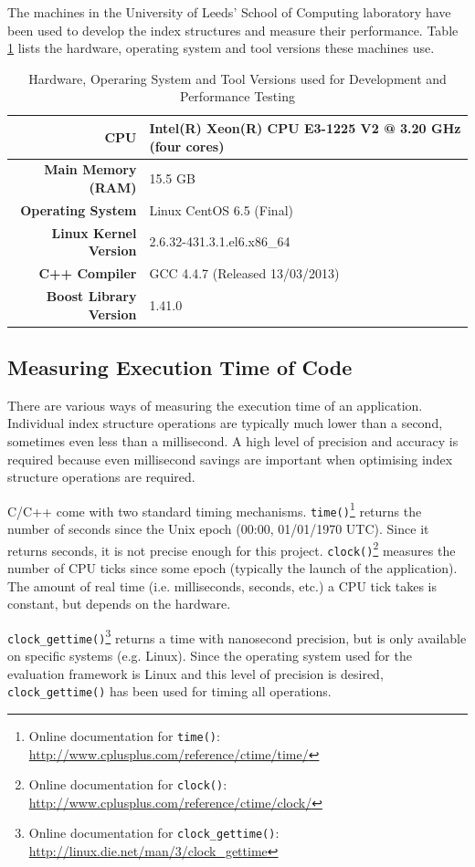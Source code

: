 The machines in the University of Leeds' School of Computing laboratory have been used to develop the index structures and measure their performance. Table \ref{tab:system-specifications} lists the hardware, operating system and tool versions these machines use.

\begin{table}
	\centering
	\begin{tabular}{|r|l|}
		\hline
		\textbf{CPU} & Intel(R) Xeon(R) CPU E3-1225 V2 @ 3.20 GHz (four cores) \\
		\hline
		\textbf{Main Memory (RAM)} & 15.5 GB \\
		\hline
		\textbf{Operating System} & Linux CentOS 6.5 (Final) \\
		\hline
		\textbf{Linux Kernel Version} & 2.6.32-431.3.1.el6.x86\_64 \\
		\hline
		\textbf{C++ Compiler} & GCC 4.4.7 (Released 13/03/2013) \\
		\hline
		\textbf{Boost Library Version} & 1.41.0 \\
		\hline
	\end{tabular}
	\caption{Hardware, Operaring System and Tool Versions used for Development and Performance Testing}
	\label{tab:system-specifications}
\end{table}

\subsection{Measuring Execution Time of Code}

There are various ways of measuring the execution time of an application. Individual index structure operations are typically much lower than a second, sometimes even less than a millisecond. A high level of precision and accuracy is required because even millisecond savings are important when optimising index structure operations are required.

C/C++ come with two standard timing mechanisms. \texttt{time()}\footnote{Online documentation for \texttt{time()}: \url{http://www.cplusplus.com/reference/ctime/time/}} returns the number of seconds since the Unix epoch (00:00, 01/01/1970 UTC). Since it returns seconds, it is not precise enough for this project. \texttt{clock()}\footnote{Online documentation for \texttt{clock()}: \url{http://www.cplusplus.com/reference/ctime/clock/}}  measures the number of CPU ticks since some epoch (typically the launch of the application). The amount of real time (i.e. milliseconds, seconds, etc.) a CPU tick takes is constant, but depends on the hardware.

\texttt{clock\_gettime()}\footnote{Online documentation for \texttt{clock\_gettime()}: \url{http://linux.die.net/man/3/clock_gettime}} returns a time with nanosecond precision, but is only available on specific systems (e.g. Linux). Since the operating system used for the evaluation framework is Linux and this level of precision is desired, \texttt{clock\_gettime()} has been used for timing all operations.